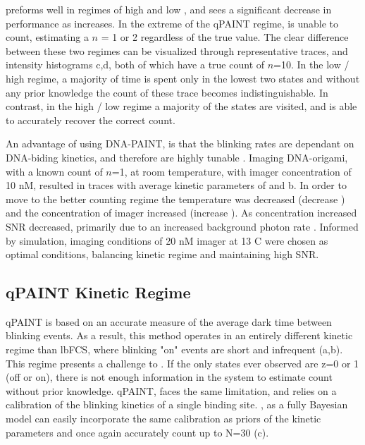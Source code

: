 \ours preforms well in regimes of high \pon and low \poff, and sees a significant decrease in performance as \poff increases. 
	In the extreme of the qPAINT regime, \ours is unable to count, estimating a $n$ = 1 or 2 regardless of the true value.
	The clear difference between these two regimes can be visualized through representative traces, and intensity histograms c,d,
	both of which have a true count of $n$=10.
	In the low \pon / high \poff regime, a majority of time is spent only in the lowest two states and without 
	any prior knowledge the count of these trace becomes indistinguishable.
	In contrast, in the high \pon / low \poff regime a majority of the states are visited, and \ours 
	is able to accurately recover the correct count.

An advantage of using DNA-PAINT, is that the blinking rates are dependant on DNA-biding kinetics,
	and therefore are highly tunable \cite{wade_2019, strauss_2020}. %
	Imaging DNA-origami, with a known count of $n$=1, at room temperature, with imager concentration of 10 nM, 
	resulted in traces with average kinetic parameters of  and  b. 
	In order to move to the better counting regime the temperature was decreased (decrease \poff) 
	and the concentration of imager increased (increase \pon).
	As concentration increased SNR decreased, primarily due to an increased background photon rate \rb.
	Informed by simulation, imaging conditions of 20 nM imager at 13 C were chosen as optimal conditions,
	balancing kinetic regime and maintaining high SNR.



\subsection{qPAINT Kinetic Regime}
qPAINT is based on an accurate measure of the average dark time between blinking events. 
	As a result, this method operates in an entirely different kinetic regime than lbFCS, where blinking "on" events are short and infrequent (a,b).
	This regime presents a challenge to \ours. 
	If the only states ever observed are z=0 or 1 (off or on), there is not enough information in the system to estimate count without prior knowledge.
	qPAINT, faces the same limitation, and relies on a calibration of the blinking kinetics of a single binding site.
	\ours, as a fully Bayesian model can easily incorporate the same calibration as priors of the kinetic parameters
	and once again accurately count up to N=30 (c).

